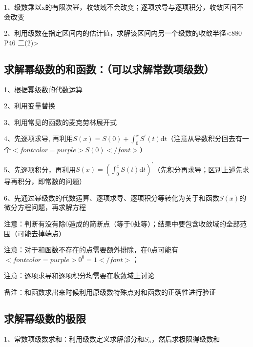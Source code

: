 1、级数乘以x的有限次幂，收敛域不会改变；逐项求导与逐项积分，收敛区间不会改变

2、利用级数在指定区间内的估计值，求解该区间内另一个级数的收敛半径<880 P46 二(2)>



\subsection{求解幂级数的和函数：（可以求解常数项级数）}

1、根据幂级数的代数运算

2、利用变量替换

3、利用常见的函数的麦克劳林展开式

4、先逐项求导, 再利用$ S(x)=S(0)+\int_{0}^{x} S^{\prime}(t) \mathrm{d} t $（注意从导数积分回去有一个$ <font color=purple>S(0)</font> $）

5、先逐项积分，再利用$ S(x)=\left(\int_{0}^{x} S(t) \mathrm{d} t\right)^{\prime} $（先积分再求导；区别上述先求导再积分，即常数的问题）

6、先通过幂级数的代数运算、逐项求导、逐项积分等转化为关于和函数$ S(x) $的微分方程问题，再求解方程

注意：判断有没有除0造成的简断点（等于0处等）；结果中要包含收敛域的全部范围（可能去掉端点）

注意：对于和函数不存在的点需要额外排除，在0点可能有$ <font color=purple>0^0=1</font> $；

注意：逐项求导和逐项积分均需要在收敛域上讨论

备注：和函数求出来时候利用原级数特殊点对和函数的正确性进行验证



\subsection{求解幂级数的极限}

1、常数项级数求和：利用级数定义求解部分和$ S_n $，然后求极限得级数和

2、幂级数求和：求解幂级数的和函数（常见得展开式经过一系列的有理运算、逐项求导和逐项积分）（幂级数和函数操作时注意判断函数的定义域），得出和函数在某点处的值（极限）

注意：这里将求数列和极限与级数关联了起来

\section{幂级数性质}

